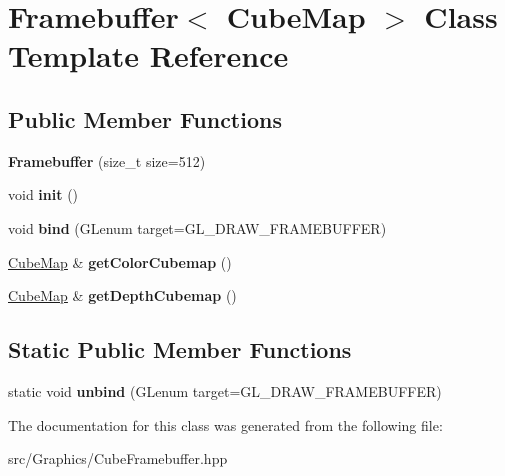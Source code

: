 \hypertarget{class_framebuffer_3_01_cube_map_01_4}{\section{Framebuffer$<$ Cube\+Map $>$ Class Template Reference}
\label{class_framebuffer_3_01_cube_map_01_4}
}
\subsection*{Public Member Functions}
\begin{DoxyCompactItemize}
\item 
\hypertarget{class_framebuffer_3_01_cube_map_01_4_a4f2023ad456a8e264228994305367772}{{\bfseries Framebuffer} (size\+\_\+t size=512)}\label{class_framebuffer_3_01_cube_map_01_4_a4f2023ad456a8e264228994305367772}

\item 
\hypertarget{class_framebuffer_3_01_cube_map_01_4_a78ee821aa870f0b1a20037b3fef93440}{void {\bfseries init} ()}\label{class_framebuffer_3_01_cube_map_01_4_a78ee821aa870f0b1a20037b3fef93440}

\item 
\hypertarget{class_framebuffer_3_01_cube_map_01_4_a8af2dea06f02f1006e9a2464de4781c6}{void {\bfseries bind} (G\+Lenum target=G\+L\+\_\+\+D\+R\+A\+W\+\_\+\+F\+R\+A\+M\+E\+B\+U\+F\+F\+E\+R)}\label{class_framebuffer_3_01_cube_map_01_4_a8af2dea06f02f1006e9a2464de4781c6}

\item 
\hypertarget{class_framebuffer_3_01_cube_map_01_4_a13f90271d17e9044ee8a6b9851e23cad}{\hyperlink{class_cube_map}{Cube\+Map} \& {\bfseries get\+Color\+Cubemap} ()}\label{class_framebuffer_3_01_cube_map_01_4_a13f90271d17e9044ee8a6b9851e23cad}

\item 
\hypertarget{class_framebuffer_3_01_cube_map_01_4_a030db738a715d191b44364bfb2bff900}{\hyperlink{class_cube_map}{Cube\+Map} \& {\bfseries get\+Depth\+Cubemap} ()}\label{class_framebuffer_3_01_cube_map_01_4_a030db738a715d191b44364bfb2bff900}

\end{DoxyCompactItemize}
\subsection*{Static Public Member Functions}
\begin{DoxyCompactItemize}
\item 
\hypertarget{class_framebuffer_3_01_cube_map_01_4_abeacf4f546f7eacccf0c84e348ebd9bc}{static void {\bfseries unbind} (G\+Lenum target=G\+L\+\_\+\+D\+R\+A\+W\+\_\+\+F\+R\+A\+M\+E\+B\+U\+F\+F\+E\+R)}\label{class_framebuffer_3_01_cube_map_01_4_abeacf4f546f7eacccf0c84e348ebd9bc}

\end{DoxyCompactItemize}


The documentation for this class was generated from the following file\+:\begin{DoxyCompactItemize}
\item 
src/\+Graphics/Cube\+Framebuffer.\+hpp\end{DoxyCompactItemize}
